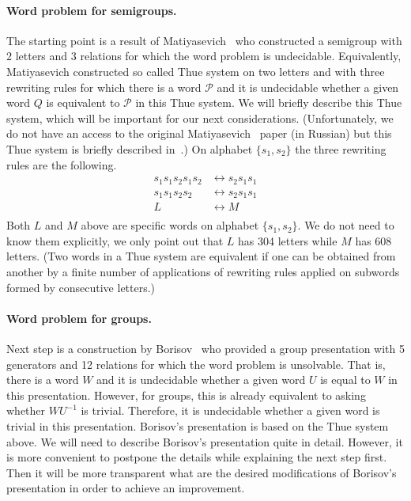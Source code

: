 \documentclass[10pt,a4paper]{article}
\theoremstyle{definition}
\theoremstyle{remark}
\newcommand\PP{\mathcal{P}}
\begin{document}
\paragraph{Word problem for semigroups.}
The starting point is a result of Matiyasevich~\cite{matiyasevich67} who
constructed a semigroup with $2$ letters and $3$ relations for which the word
problem is undecidable. Equivalently, Matiyasevich constructed so called Thue
system on two letters and with three rewriting rules for which there is a word
$\PP$ and it is undecidable whether a given word $Q$ is equivalent to $\PP$ in this
Thue system. We will briefly describe this Thue system, which will be important
for our next considerations. (Unfortunately, we do not have an access to the
original Matiyasevich~\cite{matiyasevich67} paper (in Russian) but this Thue
system is briefly described in~\cite[Eq. (6)]{matiyasevich95}.)
On alphabet $\{s_1, s_2\}$ the three rewriting rules are the following.
\begin{align*}
  s_1s_1s_2s_1s_2 &\longleftrightarrow s_2s_1s_1 \\
  s_1s_1s_2s_2 &\longleftrightarrow s_2s_1s_1 \\
   L &\longleftrightarrow M\\
\end{align*}
Both $L$ and $M$ above are specific words on alphabet $\{s_1, s_2\}$.
We do not need to know them explicitly, we only point out that $L$ has 304
letters while $M$ has 608 letters. (Two words in a Thue system are equivalent
if one can be obtained from another by a finite number of applications of
rewriting rules applied on subwords formed by consecutive letters.)


\paragraph{Word problem for groups.}
Next step is a construction by Borisov~\cite{borisov69} who provided a group presentation with 5
generators and 12 relations for which the word problem is unsolvable. That is,
there is a word $W$ and it is undecidable whether a given word $U$ is equal to
$W$ in this presentation. However, for groups, this is already equivalent to
asking whether $WU^{-1}$ is trivial. Therefore, it is undecidable whether a
given word is trivial in this presentation. Borisov's presentation is based on
the Thue system above. We will need to describe Borisov's
presentation quite in detail. However, it is more convenient to postpone the
details while explaining the next step first. Then it will be more transparent
what are the desired modifications of Borisov's presentation in order to
achieve an improvement.
\end{document}
